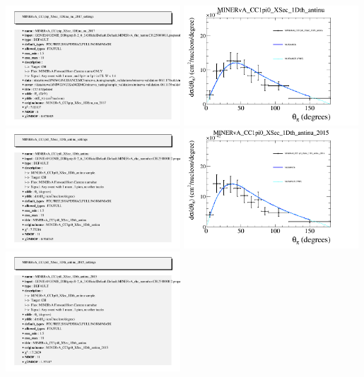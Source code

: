 \documentclass{article}
\begin{document}
\includegraphics[width=0.49\textwidth]{figures/nuisance_MINERvA_CC1pip_XSec_1DEnu_nu_2017_info.png}
\centering
\includegraphics[width=0.49\textwidth]{figures/nuisance_MINERvA_CC1pi0_XSec_1Dth_antinu_comp.png}
\includegraphics[width=0.49\textwidth]{figures/nuisance_MINERvA_CC1pi0_XSec_1Dth_antinu_info.png}
\centering
\includegraphics[width=0.49\textwidth]{figures/nuisance_MINERvA_CC1pi0_XSec_1Dth_antinu_2015_comp.png}
\includegraphics[width=0.49\textwidth]{figures/nuisance_MINERvA_CC1pi0_XSec_1Dth_antinu_2015_info.png}
\end{document}
